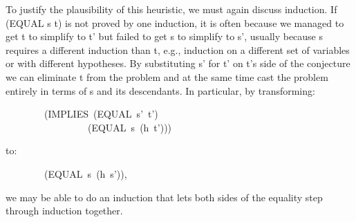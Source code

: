 \documentclass[11pt]{book}
\newenvironment{pubasis}{\begin{flushleft}\ttfamily\small}{\normalsize\rmfamily\end{flushleft}}
\begin{document}
To justify the plausibility of this heuristic, we must again discuss induction.  If (EQUAL s t)
is not proved by one induction, it is often because
we managed to get t to simplify to t' but failed to get s to simplify to s',
 usually because s requires a different induction
than t, e.g., induction on a different set of variables or with different
hypotheses.  By substituting s' for t' on t's side of the conjecture we
can eliminate t from the problem and at the same time cast the problem
entirely in terms of s and its descendants.  In particular, by transforming:
\begin{pubasis}
~~~~~~~~(IMPLIES~(EQUAL~s'~t')\\
~~~~~~~~~~~~~~~~~(EQUAL~s~(h~t')))\\
\end{pubasis}
to:
\begin{pubasis}
~~~~~~~~(EQUAL~s~(h~s')),\\
\end{pubasis}
we may be able to do an induction that lets both sides of the equality
step through induction together.
\end{document}
